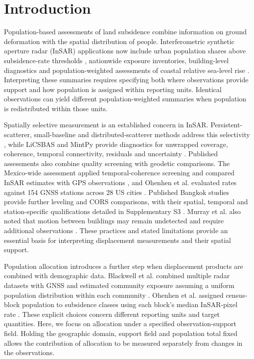 \documentclass[pdflatex,sn-nature]{sn-jnl}
\begin{document}
\section{Introduction}
Population-based assessments of land subsidence combine information on ground deformation with the spatial distribution of people. Interferometric synthetic aperture radar (InSAR) applications now include urban population shares above subsidence-rate thresholds \citep{ao2024national}, nationwide exposure inventories, building-level diagnostics and population-weighted assessments of coastal relative sea-level rise \citep{xiong2026nationwide,yang2026buildingrisk,oelsmann2026coastal}. Interpreting these summaries requires specifying both where observations provide support and how population is assigned within reporting units. Identical observations can yield different population-weighted summaries when population is redistributed within those units.

Spatially selective measurement is an established concern in InSAR. Persistent-scatterer, small-baseline and distributed-scatterer methods address this selectivity \citep{ferretti2001ps,berardino2002sbas,ferretti2011squeeSAR}, while LiCSBAS and MintPy provide diagnostics for unwrapped coverage, coherence, temporal connectivity, residuals and uncertainty \citep{morishita2020licsbas,yunjun2019mintpy}. Published assessments also combine quality screening with geodetic comparisons. The Mexico-wide assessment applied temporal-coherence screening and compared InSAR estimates with GPS observations \citep{fernandeztorres2024mexico}, and Ohenhen et al. evaluated rates against 154 GNSS stations across 28 US cities \citep{ohenhen2025uscities}. Published Bangkok studies provide further leveling and CORS comparisons, with their spatial, temporal and station-specific qualifications detailed in Supplementary S3 \citep{luachapichatikul2020bangkok,pumpuang2024bangkapi,aieorattanawadee2022bangkok}. Murray et al. also noted that motion between buildings may remain undetected and require additional observations \citep{murray2025hawaii}. These practices and stated limitations provide an essential basis for interpreting displacement measurements and their spatial support.

Population allocation introduces a further step when displacement products are combined with demographic data. Blackwell et al. combined multiple radar datasets with GNSS and estimated community exposure assuming a uniform population distribution within each community \citep{blackwell2020california}. Ohenhen et al. assigned census-block population to subsidence classes using each block's median InSAR-pixel rate \citep{ohenhen2025uscities}. These explicit choices concern different reporting units and target quantities. Here, we focus on allocation under a specified observation-support field. Holding the geographic domain, support field and population total fixed allows the contribution of allocation to be measured separately from changes in the observations.
\end{document}
